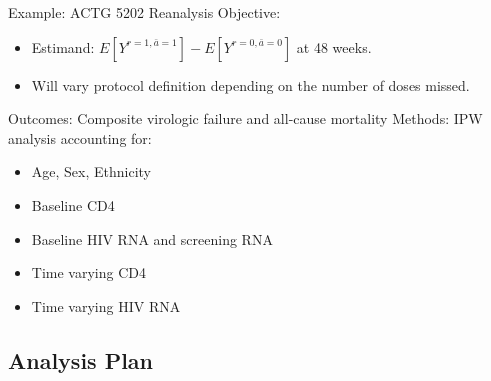 \documentclass{beamer}
\begin{document}
    \begin{frame}{Example: ACTG 5202 Reanalysis}
            Objective:
        \begin{itemize}
            \item Estimand: $E\left[Y^{r=1,\bar{a}=1}\right]-E\left[Y^{r=0,\bar{a}=0}\right]$ at 48 weeks. %
            \item Will vary protocol definition depending on the number of doses missed.
        \end{itemize}
        \vspace{0.4cm}
        Outcomes: Composite virologic failure and all-cause mortality
        \vspace{0.4cm}
        Methods: IPW analysis accounting for:
            \begin{itemize}
                        \item Age, Sex, Ethnicity
                        \item Baseline CD4
                        \item Baseline HIV RNA and screening RNA
                        \item Time varying CD4
                        \item Time varying HIV RNA
            \end{itemize}
    \end{frame}

\subsection{Analysis Plan}
\end{document}
